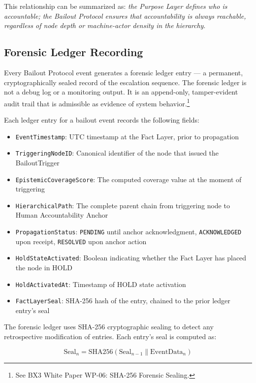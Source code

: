 This relationship can be summarized as: \emph{the Purpose Layer defines who is accountable; the Bailout Protocol ensures that accountability is always reachable, regardless of node depth or machine-actor density in the hierarchy}.

\subsection{Forensic Ledger Recording}

Every Bailout Protocol event generates a forensic ledger entry --- a permanent, cryptographically sealed record of the escalation sequence. The forensic ledger is not a debug log or a monitoring output. It is an append-only, tamper-evident audit trail that is admissible as evidence of system behavior.\footnote{See BX3 White Paper WP-06: SHA-256 Forensic Sealing.}

Each ledger entry for a bailout event records the following fields:

\begin{itemize}
    \item \texttt{EventTimestamp}: UTC timestamp at the Fact Layer, prior to propagation
    \item \texttt{TriggeringNodeID}: Canonical identifier of the node that issued the BailoutTrigger
    \item \texttt{EpistemicCoverageScore}: The computed coverage value at the moment of triggering
    \item \texttt{HierarchicalPath}: The complete parent chain from triggering node to Human Accountability Anchor
    \item \texttt{PropagationStatus}: \texttt{PENDING} until anchor acknowledgment, \texttt{ACKNOWLEDGED} upon receipt, \texttt{RESOLVED} upon anchor action
    \item \texttt{HoldStateActivated}: Boolean indicating whether the Fact Layer has placed the node in HOLD
    \item \texttt{HoldActivatedAt}: Timestamp of HOLD state activation
    \item \texttt{FactLayerSeal}: SHA-256 hash of the entry, chained to the prior ledger entry's seal
\end{itemize}

The forensic ledger uses SHA-256 cryptographic sealing to detect any retrospective modification of entries. Each entry's seal is computed as:

\begin{equation}
    \text{Seal}_n = \text{SHA256}( \text{Seal}_{n-1} \parallel \text{EventData}_n )
\end{equation}

